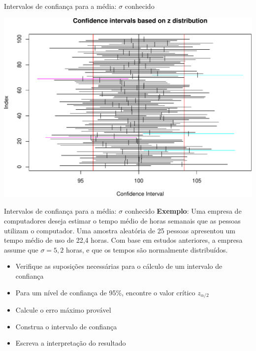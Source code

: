\documentclass[10pt]{beamer}\usepackage[]{graphicx}\usepackage[]{color}
\newenvironment{knitrout}{}{} %
\theoremstyle{definition}
\begin{document}
\begin{frame}{Intervalos de confiança para a média: $\sigma$ conhecido}
\begin{knitrout}\footnotesize
{}\color{fgcolor}

{\centering \includegraphics[width=1\textwidth]{figure/unnamed-chunk-1-1} 

}



\end{knitrout}
\end{frame}

\begin{frame}{Intervalos de confiança para a média: $\sigma$ conhecido}
  \textbf{Exemplo}: Uma empresa de computadores deseja estimar o tempo médio de
  horas semanais que as pessoas utilizam o computador. Uma amostra
  aleatória de 25 pessoas apresentou um tempo médio
  de uso de 22,4 horas. Com base em estudos anteriores, a empresa assume
  que $\sigma = 5,2$ horas, e que os tempos são normalmente
  distribuídos.
  \begin{itemize}
  \item[a)] Verifique as suposições necessárias para o cálculo de
    um intervalo de confiança
  \item[b)] Para um nível de confiança de 95\%, encontre o valor crítico
    $z_{\alpha/2}$
  \item[c)] Calcule o erro máximo provável
  \item[d)] Construa o intervalo de confiança
  \item[e)] Escreva a interpretação do resultado
  \end{itemize}
\end{frame}
\end{document}

